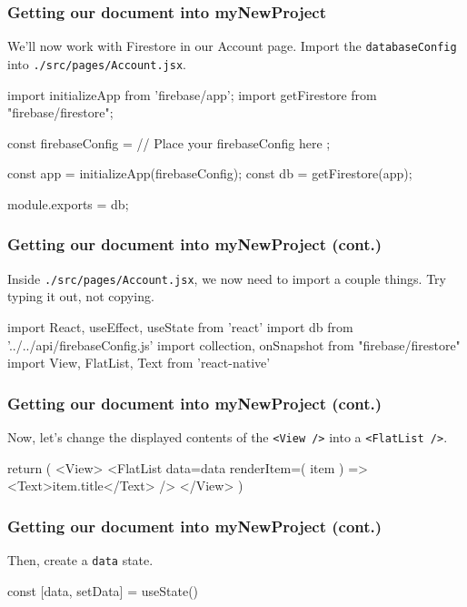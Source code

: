 \documentclass{beamer}
\begin{document}
  \begin{frame}[fragile]
    \frametitle{Getting our document into myNewProject}
    We'll now work with Firestore in our Account page. Import the \verb|databaseConfig| into \verb|./src/pages/Account.jsx|.

    \begin{jscodesmall}
import { initializeApp } from 'firebase/app';
import { getFirestore } from "firebase/firestore";

const firebaseConfig = {
  // Place your firebaseConfig here
};

const app = initializeApp(firebaseConfig);
const db = getFirestore(app);

module.exports = db;
    \end{jscodesmall}
  \end{frame}

  \begin{frame}[fragile]
    \frametitle{Getting our document into myNewProject (cont.)}
    Inside \verb|./src/pages/Account.jsx|, we now need to import a couple things.
    Try typing it out, not copying. 

    \begin{jscodesmall}
import React, {useEffect, useState} from 'react'
import db from '../../api/firebaseConfig.js'
import {collection, onSnapshot} from "firebase/firestore"
import {View, FlatList, Text} from 'react-native'
    \end{jscodesmall}
  \end{frame}

  \begin{frame}[fragile]
    \frametitle{Getting our document into myNewProject (cont.)}
    Now, let's change the displayed contents of the \verb|<View />| into a \verb|<FlatList />|. 

    \begin{jscodesmall}
return (
  <View>
    <FlatList
      data={data}
      renderItem={({ item }) => <Text>{item.title}</Text>}
    />
  </View>
)
    \end{jscodesmall}
  \end{frame}

  \begin{frame}[fragile]
    \frametitle{Getting our document into myNewProject (cont.)}
    Then, create a \verb|data| state. 

    \begin{jscodesmall}
const [data, setData] = useState()
    \end{jscodesmall}
  \end{frame}
  
\end{document}
